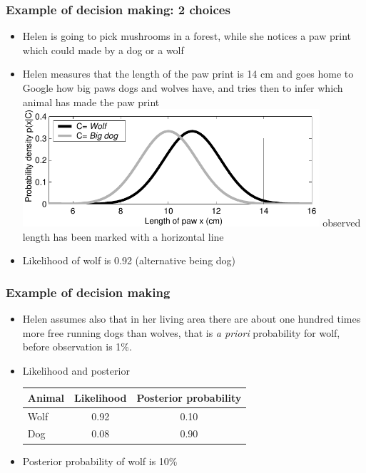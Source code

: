 \documentclass[10pt,handout]{beamer}
\begin{document}
\begin{frame}

\frametitle{Example of decision making: 2 choices}

\begin{itemize}
\item<+-> Helen is going to pick mushrooms in a forest, while she notices a
  paw print which could made by a dog or a wolf
\item<+-> Helen measures that the length of the paw print is 14 cm and
  goes home to Google how big paws dogs and wolves have, and tries
  then to infer which animal has made the paw print
  \includegraphics[width=11cm]{figs/hatutus_likelihoods}
  observed length has been marked with a horizontal line
\item<+-> Likelihood of wolf is 0.92 (alternative being dog)
\end{itemize}

\end{frame}

\begin{frame}

\frametitle{Example of decision making}

  \begin{itemize}
  \item<+-> Helen assumes also that in her living area there are about one
    hundred times more free running dogs than wolves, that is {\em a
      priori} probability for wolf, before observation is 1\%.
  \item<+-> Likelihood and posterior
    \begin{center}\leavevmode
      \begin{tabular}{| l | c c |}
        \hline
        Animal &  Likelihood & Posterior probability \\
        \hline
        Wolf     &  0.92            & 0.10      \\
        Dog    &  0.08        & 0.90    \\
        \hline
      \end{tabular}
    \end{center}
  \item<+-> Posterior probability of wolf is 10\%
  \end{itemize}

\end{frame}
\end{document}
